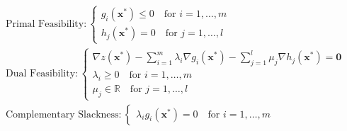 \begin{theorem}
\begin{gather*}
\text{Primal Feasibility}: \left\{
\begin{aligned}
g_i(\mathbf{x}^*) \leq 0 \quad \text{for $i = 1,\dots,m$}\\
h_j(\mathbf{x}^*) = 0 \quad \text{for $j = 1,\dots,l$}
\end{aligned}
\right.\\
\text{Dual Feasibility}:\left\{
\begin{aligned}
\nabla z(\mathbf{x}^*) - \sum_{i = 1}^m\lambda_i\nabla g_i(\mathbf{x}^*) - \sum_{j = 1}^{l}\mu_j\nabla h_j(\mathbf{x}^*) = \mathbf{0}\\
\lambda_i \geq 0 \quad \text{for $i=1,\dots,m$}\\
\mu_j \in \mathbb{R} \quad \text{for $j = 1,\dots,l$}
\end{aligned}
\right.\\
\text{Complementary Slackness}:\left\{
\begin{aligned}
\lambda_ig_i(\mathbf{x}^*) = 0 \quad \text{for $i = 1,\dots,m$}
\end{aligned}
\right.
\end{gather*}
\label{thm:KKT7}
\end{theorem}

